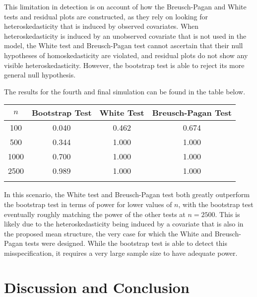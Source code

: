 \documentclass[12pt]{article} %
\theoremstyle{definition}
\begin{document}
This limitation in detection is on account of how the Breusch-Pagan and White tests and residual plots are constructed, as they rely on looking for heteroskedasticity that is induced by observed covariates.
When heteroskedasticity is induced by an unobserved covariate that is not used in the model, the White test and Breusch-Pagan test cannot ascertain that their
null hypotheses of homoskedasticity are violated, and residual plots do not show any visible heteroskedasticity. However, the bootstrap test is able to reject its more general null hypothesis.

The results for the fourth and final simulation can be found in the table below.

\begin{table}[H]
	\centering
	\small\addtolength{\tabcolsep}{-3pt}
	\setlength\extrarowheight{-3pt}
	{
	\begin{tabular}{ c|c|c|c}
	$n$ & Bootstrap Test & White Test & Breusch-Pagan Test \\
	 \hline
	 100 & 0.040 & 0.462 & 0.674 \\
	 500 & 0.344 & 1.000 & 1.000 \\
	 1000 & 0.700 & 1.000 & 1.000 \\
	 2500 & 0.989 & 1.000 & 1.000 \\
	 \Xhline{3\arrayrulewidth}
	\end{tabular}
	}
\end{table}

In this scenario, the White test and Breusch-Pagan test both greatly outperform the bootstrap test in terms of power for lower values of $n$, with the bootstrap test
eventually roughly matching the power of the other tests at $n = 2500$. This is likely due to the heteroskedasticity being induced by a covariate that is also in the 
proposed mean structure, the very case for which the White and Breusch-Pagan tests were designed. While the bootstrap test is able to detect this misspecification,
it requires a very large sample size to have adequate power.


\section{Discussion and Conclusion}
\end{document}
